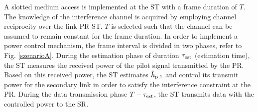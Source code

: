 A slotted medium access is implemented at the ST with a frame duration of $T$. The knowledge of the interference channel is acquired by employing channel reciprocity over the link PR-ST. $T$ is selected such that the channel can be assumed to remain constant for the frame duration. %
In order to implement a power control mechanism, the frame interval is divided in two phases, refer to Fig. \ref{szenarioA}. During the estimation phase of duration $\tau_{\text{est}}$ (estimation time), the ST measures the received power of the pilot signal transmitted by the PR. Based on this received power, the ST estimates $\hat{h}_{\text{p,1}}$ and control its transmit power for the secondary link in order to satisfy the interference constraint at the PR. During the data transmission phase $T-\tau_{\text{est}}$, the ST transmits data with the controlled power to the SR.

